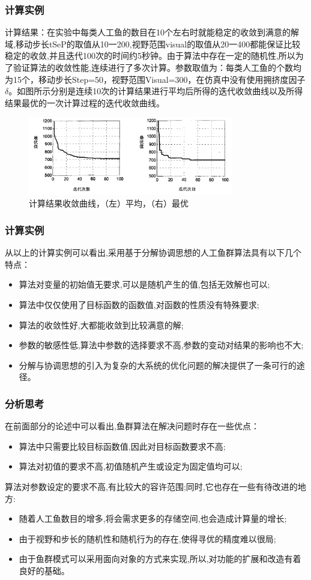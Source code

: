 \begin{frame}
\frametitle{计算实例}
\small{计算结果：在实验中每类人工鱼的数目在10个左右时就能稳定的收敛到满意的解域,移动步长tSeP的取值从10一200,视野范围visual的取值从20一400都能保证比较稳定的收敛,并且迭代100次的时间约5秒钟。由于算法中存在一定的随机性,所以为了验证算法的收敛性能,连续进行了多次计算。参数取值为：每类人工鱼的个数均为15个，移动步长Step=50，视野范围Visual=300，在仿真中没有使用拥挤度因子$\delta$。如图所示分别是连续10次的计算结果进行平均后所得的迭代收敛曲线以及所得结果最优的一次计算过程的迭代收敛曲线。}
\begin{figure}[H]
\centering
\includegraphics[width=0.8\textwidth]{pic/fish16.png}
\caption{计算结果收敛曲线，（左）平均，（右）最优}
\end{figure}
\end{frame}

\begin{frame}
\frametitle{计算实例}
从以上的计算实例可以看出,采用基于分解协调思想的人工鱼群算法具有以下几个特点：
\begin{itemize}
\item 算法对变量的初始值无要求,可以是随机产生的值,包括无效解也可以;
\item 算法中仅仅使用了目标函数的函数值,对函数的性质没有特殊要求;
\item 算法的收敛性好,大都能收敛到比较满意的解;
\item 参数的敏感性低,算法中参数的选择要求不高,参数的变动对结果的影响也不大;
\item 分解与协调思想的引入为复杂的大系统的优化问题的解决提供了一条可行的途径。
\end{itemize}
\end{frame}

\begin{frame}
\frametitle{分析思考}
在前面部分的论述中可以看出,鱼群算法在解决问题时存在一些优点：\\
\begin{itemize}
\item 算法中只需要比较目标函数值,因此对目标函数要求不高;
\item 算法对初值的要求不高,初值随机产生或设定为固定值均可以;
\end{itemize}
\indent 算法对参数设定的要求不高,有比较大的容许范围;同时,它也存在一些有待改进的地方:
\begin{itemize}
\item 随着人工鱼数目的增多,将会需求更多的存储空间,也会造成计算量的增长;
\item 由于视野和步长的随机性和随机行为的存在,使得寻优的精度难以很局;
\item 由于鱼群模式可以采用面向对象的方式来实现,所以,对功能的扩展和改造有着良好的基础。
\end{itemize}
\end{frame}

